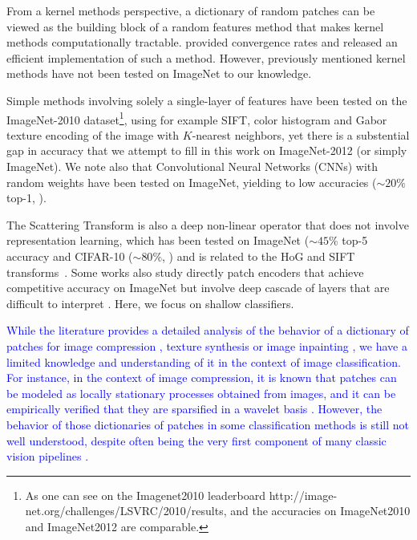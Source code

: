 \documentclass{article} %
\newcommand{\Edouard}[1]{\textcolor{blue}{#1}}
\begin{document}
From a kernel methods perspective, a dictionary of random patches can be viewed as the building block of a random features method \citep{rahimi2008random} that makes kernel methods computationally tractable.
\cite{rudi2017falkon} provided convergence rates and released an efficient implementation of such a method.
However, previously mentioned kernel methods \citep{mairal2016end,li2019enhanced,shankar2020neural} have not been tested on ImageNet to our knowledge.

Simple methods involving solely a single-layer of  features  have been tested on the ImageNet-2010 dataset\footnote{ As one can see on the Imagenet2010 leaderboard http://image-net.org/challenges/LSVRC/2010/results, and the accuracies on ImageNet2010 and ImageNet2012 are comparable.}, using for example SIFT, color histogram and Gabor texture encoding of the image with $K$-nearest neighbors, yet there is a substential gap in accuracy that we attempt to fill in this work on ImageNet-2012 (or simply ImageNet). We note also that Convolutional Neural Networks (CNNs) with random weights have been tested on ImageNet, yielding to low accuracies ($\sim 20\%$ top-1, \citep{arandjelovic2017look}).

The Scattering Transform \citep{mallat2012group} is also a deep non-linear operator that does not involve representation learning, which has been tested on ImageNet ($\sim 45\%$ top-5 accuracy \citep{zarka2019deep} and  CIFAR-10 ($\sim 80 \%$, \citep{Oyallon_2015_CVPR}) and is related to the HoG and SIFT transforms~\citep{Oyallon_2018_ECCV}.
Some works also study directly patch encoders that achieve competitive accuracy on ImageNet but involve deep cascade of layers that are difficult to interpret \citep{oyallon2017scaling,zarka2019deep,brendel2019approximating}. Here, we focus on shallow classifiers.



 \Edouard{ While the literature provides a detailed analysis of the behavior of a dictionary of patches for image compression
\citep{wallace1992jpeg}, texture synthesis \citep{efros1999texture} or image inpainting \citep{criminisi2004region}, we have a limited knowledge and understanding of it in the context of image classification. For instance, in the context of image compression, it is known that patches can be modeled as locally stationary processes obtained from images, and it can be empirically verified that they are sparsified in a wavelet basis \citep{mallat1999wavelet}. However, the behavior of those dictionaries of patches in some classification methods is still not well understood, despite often being the very first component of many classic vision pipelines \citep{perronnin2010improving,lowe2004distinctive,brendel2019approximating,oyallon2018scattering}.}
\end{document}
